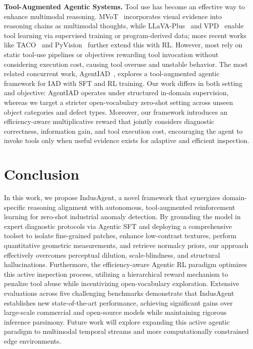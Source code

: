 \documentclass{article}
\begin{document}
\textbf{Tool-Augmented Agentic Systems.}
Tool use has become an effective way to enhance multimodal reasoning. MVoT~\citep{li2025MVoT} incorporates visual evidence into reasoning chains as multimodal thoughts, while LLaVA-Plus~\citep{liu2023llavapluslearningusetools} and VPD~\citep{hu2024visual} enable tool learning via supervised training or program-derived data; more recent works like TACO~\citep{ma2024taco} and PyVision~\citep{zhao2025pyvision} further extend this with RL. However, most rely on static tool-use pipelines or objectives rewarding tool invocation without considering execution cost, causing tool overuse and unstable behavior. The most related concurrent work, AgentIAD~\citep{miao2025agentiad}, explores a tool-augmented agentic framework for IAD with SFT and RL training. Our work differs in both setting and objective: AgentIAD operates under structured in-domain supervision, whereas we target a stricter open-vocabulary zero-shot setting across unseen object categories and defect types. Moreover, our framework introduces an efficiency-aware multiplicative reward that jointly considers diagnostic correctness, information gain, and tool execution cost, encouraging the agent to invoke tools only when useful evidence exists for adaptive and efficient inspection.

\section{Conclusion}
In this work, we propose IndusAgent, a novel framework that synergizes domain-specific reasoning alignment with autonomous, tool-augmented reinforcement learning for zero-shot industrial anomaly detection. By grounding the model in expert diagnostic protocols via Agentic SFT and deploying a comprehensive toolset to isolate fine-grained patches, enhance low-contrast textures, perform quantitative geometric measurements, and retrieve normalcy priors, our approach effectively overcomes perceptual dilution, scale-blindness, and structural hallucinations. Furthermore, the efficiency-aware Agentic RL paradigm optimizes this active inspection process, utilizing a hierarchical reward mechanism to penalize tool abuse while incentivizing open-vocabulary exploration. Extensive evaluations across five challenging benchmarks demonstrate that IndusAgent establishes new state-of-the-art performance, achieving significant gains over large-scale commercial and open-source models while maintaining rigorous inference parsimony. Future work will explore expanding this active agentic paradigm to multimodal temporal streams and more computationally constrained edge environments.
\end{document}
